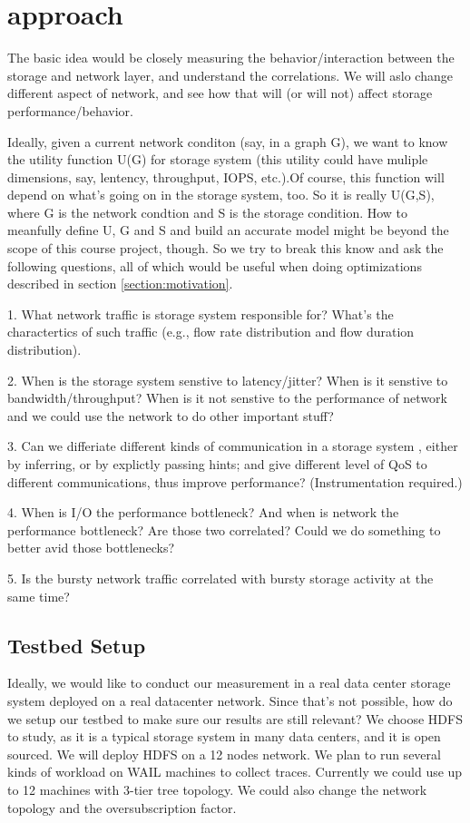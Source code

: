 \section{approach}
\label{sec:approach}
The basic idea would be closely measuring the behavior/interaction between the storage and network layer, and understand the correlations. We will aslo change different aspect of network, and see how that will (or will not) affect storage performance/behavior.

Ideally, given a current network conditon (say, in a graph G), we want to know the utility function U(G) for storage system (this utility could have muliple dimensions, say, lentency, throughput, IOPS, etc.).Of course, this function will depend on what's going on in the storage system, too. So it is really U(G,S), where G is the network condtion and S is the storage  condition. How to meanfully define U, G and S and build an accurate model might be beyond the scope of this course project, though. So we try to break this know and ask the following questions, all of which would be useful when doing optimizations described in section \ref{section:motivation}.

1. What network traffic is storage system responsible for? What's the charactertics of such traffic (e.g., flow rate distribution and flow duration distribution).

2. When is the storage system senstive to latency/jitter? When is it senstive to bandwidth/throughput? When is it not senstive to the performance of network and we could use the network to do other important stuff? 

3. Can we differiate different kinds of communication in a storage system %
, either by inferring, or by explictly passing hints; and give different level of QoS to different communications, thus improve performance? (Instrumentation required.)

4. When is I/O the performance bottleneck? And when is network the performance bottleneck? Are those two correlated? Could we do something to better avid those bottlenecks?

5. Is the bursty network traffic correlated with bursty storage activity at the same time? 






\subsection {\bf Testbed Setup}
Ideally, we would like to conduct our measurement in a real data center storage system deployed on a real datacenter network. Since that’s not possible, how do we setup our testbed to make sure our results are still relevant? 
We choose HDFS to study, as it is a typical storage system in many data centers, and it is open sourced. We will deploy HDFS on a 12 nodes network. We plan to run several kinds of workload on WAIL machines to collect traces. Currently we could use up to 12 machines with 3-tier tree topology. We could also change the network topology and the oversubscription factor. 

